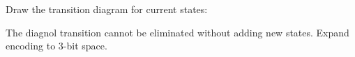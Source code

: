 \documentclass[12pt, a4paper]{article}
\begin{document}
	Draw the transition diagram for current states:
	\begin{center}
	\end{center}
	
	The diagnol transition cannot be eliminated without adding new states.
	Expand encoding to 3-bit space.
	
\end{document}
